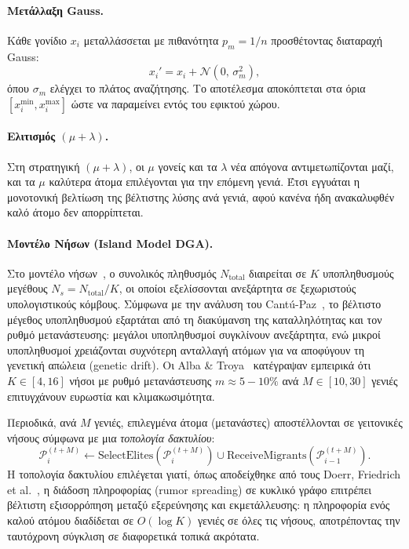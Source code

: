 \paragraph{Μετάλλαξη Gauss.}
Κάθε γονίδιο $x_i$ μεταλλάσσεται με πιθανότητα $p_m = 1/n$ προσθέτοντας διαταραχή Gauss:
\begin{equation}
    x_i' = x_i + \mathcal{N}(0,\, \sigma_m^2),
\end{equation}
όπου $\sigma_m$ ελέγχει το πλάτος αναζήτησης. Το αποτέλεσμα αποκόπτεται στα όρια $[x_i^{\min}, x_i^{\max}]$ ώστε να παραμείνει εντός του εφικτού χώρου.

\paragraph{Ελιτισμός $(\mu + \lambda)$.}
Στη στρατηγική $(\mu + \lambda)$, οι $\mu$ γονείς και τα $\lambda$ νέα απόγονα αντιμετωπίζονται μαζί, και τα $\mu$ καλύτερα άτομα επιλέγονται για την επόμενη γενιά. Έτσι εγγυάται η μονοτονική βελτίωση της βέλτιστης λύσης ανά γενιά, αφού κανένα ήδη ανακαλυφθέν καλό άτομο δεν απορρίπτεται.

\paragraph{Μοντέλο Νήσων (Island Model DGA).}
Στο μοντέλο νήσων~\cite{whitley1999island}, ο συνολικός πληθυσμός $N_{\text{total}}$ διαιρείται σε $K$ υποπληθυσμούς μεγέθους $N_s = N_{\text{total}} / K$, οι οποίοι εξελίσσονται ανεξάρτητα σε ξεχωριστούς υπολογιστικούς κόμβους. Σύμφωνα με την ανάλυση του Cantú-Paz~\cite{cantupaz2000parallel}, το βέλτιστο μέγεθος υποπληθυσμού εξαρτάται από τη διακύμανση της καταλληλότητας και τον ρυθμό μετανάστευσης: μεγάλοι υποπληθυσμοί συγκλίνουν ανεξάρτητα, ενώ μικροί υποπληθυσμοί χρειάζονται συχνότερη ανταλλαγή ατόμων για να αποφύγουν τη γενετική απώλεια (genetic drift). Οι Alba \& Troya~\cite{alba1999survey} κατέγραψαν εμπειρικά ότι $K \in [4, 16]$ νήσοι με ρυθμό μετανάστευσης $m \approx 5{-}10\%$ ανά $M \in [10, 30]$ γενιές επιτυγχάνουν ευρωστία και κλιμακωσιμότητα.

Περιοδικά, ανά $M$ γενιές, επιλεγμένα άτομα (μετανάστες) αποστέλλονται σε γειτονικές νήσους σύμφωνα με μια \textit{τοπολογία δακτυλίου}:
\begin{equation}
    \mathcal{P}_{i}^{(t+M)} \leftarrow \text{SelectElites}\!\left(\mathcal{P}_{i}^{(t+M)}\right) \cup \text{ReceiveMigrants}\!\left(\mathcal{P}_{i-1}^{(t+M)}\right).
\end{equation}
Η τοπολογία δακτυλίου επιλέγεται γιατί, όπως αποδείχθηκε από τους Doerr, Friedrich et al.~\cite{friedrich2017island}, η διάδοση πληροφορίας (rumor spreading) σε κυκλικό γράφο επιτρέπει βέλτιστη εξισορρόπηση μεταξύ εξερεύνησης και εκμετάλλευσης: η πληροφορία ενός καλού ατόμου διαδίδεται σε $O(\log K)$ γενιές σε όλες τις νήσους, αποτρέποντας την ταυτόχρονη σύγκλιση σε διαφορετικά τοπικά ακρότατα.

